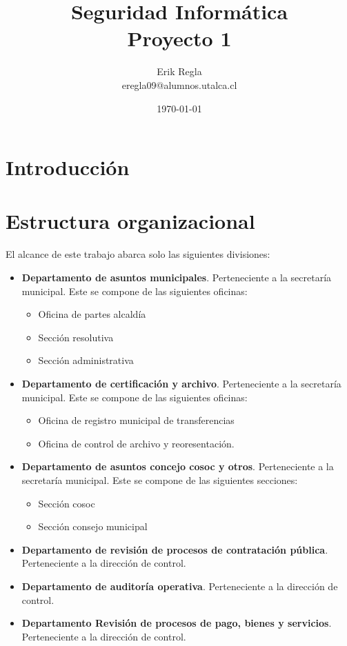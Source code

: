 \documentclass[11pt]{utalcaDoc}
\title{{\bf Seguridad Informática}\\ Proyecto 1}
\author{Erik Regla\\ eregla09@alumnos.utalca.cl}
\date{\today}
\begin{document}
\maketitle

\newpage

\section{Introducción}

\section{Estructura organizacional}
El alcance de este trabajo abarca solo las siguientes divisiones:
\begin{itemize}
	\item {
		\textbf{Departamento de asuntos municipales}. Perteneciente a la secretaría municipal. Este se compone de las siguientes oficinas:
		\begin{itemize}
			\item Oficina de partes alcaldía
			\item Sección resolutiva
			\item Sección administrativa
		\end{itemize}
	}
	\item {
		\textbf{Departamento de certificación y archivo}.  Perteneciente a la secretaría municipal. Este se compone de las siguientes oficinas:
		\begin{itemize}
			\item Oficina de registro municipal de transferencias
			\item Oficina de control de archivo y reoresentación.
		\end{itemize}
	}
	\item {
		\textbf{Departamento de asuntos concejo cosoc y otros}.  Perteneciente a la secretaría municipal. Este se compone de las siguientes secciones:
		\begin{itemize}
			\item Sección cosoc
			\item Sección consejo municipal
		\end{itemize}
	}
	\item {
		\textbf{Departamento de revisión de procesos de contratación pública}.   Perteneciente a la dirección de control.
	}
	\item {
		\textbf{Departamento de auditoría operativa}.  Perteneciente a la dirección de control.
	}
	\item {
		\textbf{Departamento Revisión de procesos de pago, bienes y servicios}.  Perteneciente a la dirección de control. 
	}
\end{itemize}
\end{document}
